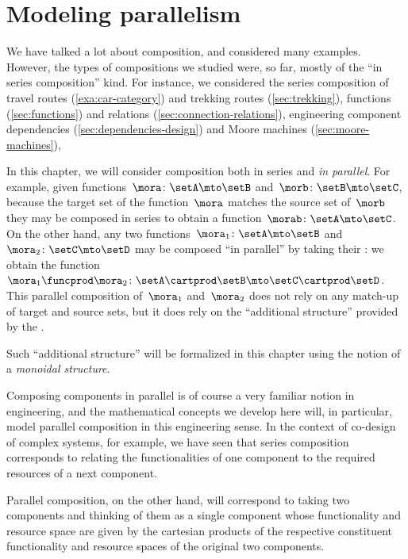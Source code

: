 
\section{Modeling parallelism}
\label{sec:modeling-parallelism}

We have talked a lot about composition, and considered many examples.
However, the types of compositions we studied were, so far, mostly of the ``in series composition'' kind.
For instance, we considered the series composition of travel routes (\cref{exa:car-category}) and trekking routes (\cref{sec:trekking}), functions (\cref{sec:functions}) and relations (\cref{sec:connection-relations}), engineering component dependencies (\cref{sec:dependencies-design}) and Moore machines (\cref{sec:moore-machines}), \etc

In this chapter, we will consider composition both in series and \emph{in parallel}.
For example, given functions~$\mora\colon \setA \mto \setB$ and~$\morb\colon \setB \mto \setC$, because the target set of the function~$\mora$ matches the source set of~$\morb$ they may be composed in series to obtain a function~$\morab\colon \setA \mto \setC$.
On the other hand, any two functions~$\mora_1 \colon \setA \mto \setB$ and~$\mora_2 \colon \setC \mto \setD$ may be composed ``in parallel'' by taking their : we obtain the function~$\mora_1 \funcprod \mora_2\colon \setA \cartprod \setB \mto \setC \cartprod \setD$.
This parallel composition of~$\mora_1$ and~$\mora_2$ does not rely on any match-up of target and source sets, but it does rely on the ``additional structure'' provided by the .

Such ``additional structure'' will be formalized in this chapter using the notion of a \emph{monoidal structure}.

Composing components in parallel is of course a very familiar notion in engineering, and the mathematical concepts we develop here will, in particular, model parallel composition in this engineering sense.
In the context of co-design of complex systems, for example, we have seen that series composition corresponds to relating the functionalities of one component to the required resources of a next component.


Parallel composition, on the other hand, will correspond to taking two components and thinking of them as a single component whose functionality and resource space are given by the cartesian products of the respective constituent functionality and resource spaces of the original two components.

